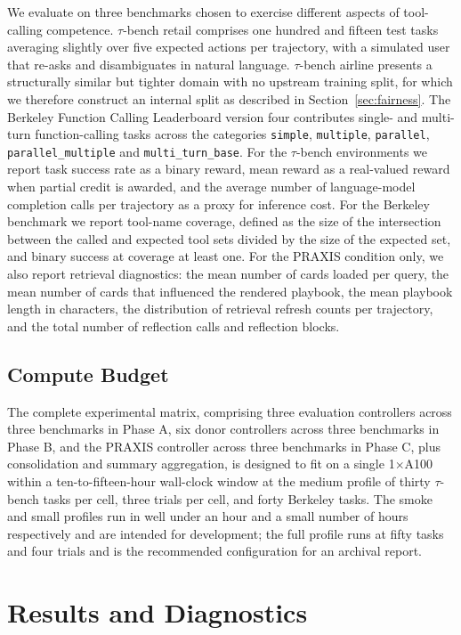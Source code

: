 \documentclass[conference]{IEEEtran}
\begin{document}
We evaluate on three benchmarks chosen to exercise different
aspects of tool-calling competence. $\tau$-bench retail comprises
one hundred and fifteen test tasks averaging slightly over five
expected actions per trajectory, with a simulated user that
re-asks and disambiguates in natural language. $\tau$-bench
airline presents a structurally similar but tighter domain with
no upstream training split, for which we therefore construct an
internal split as described in Section~\ref{sec:fairness}. The
Berkeley Function Calling Leaderboard version four contributes
single- and multi-turn function-calling tasks across the
categories \texttt{simple}, \texttt{multiple}, \texttt{parallel},
\texttt{parallel\_multiple} and \texttt{multi\_turn\_base}. For
the $\tau$-bench environments we report task success rate as a
binary reward, mean reward as a real-valued reward when partial
credit is awarded, and the average number of language-model
completion calls per trajectory as a proxy for inference cost.
For the Berkeley benchmark we report tool-name coverage, defined
as the size of the intersection between the called and expected
tool sets divided by the size of the expected set, and binary
success at coverage at least one. For the PRAXIS condition only,
we also report retrieval diagnostics: the mean number of cards
loaded per query, the mean number of cards that influenced the
rendered playbook, the mean playbook length in characters, the
distribution of retrieval refresh counts per trajectory, and the
total number of reflection calls and reflection blocks.

\subsection{Compute Budget}

The complete experimental matrix, comprising three evaluation
controllers across three benchmarks in Phase A, six donor
controllers across three benchmarks in Phase B, and the PRAXIS
controller across three benchmarks in Phase C, plus consolidation
and summary aggregation, is designed to fit on a single
1$\times$A100 within a ten-to-fifteen-hour wall-clock window at
the medium profile of thirty $\tau$-bench tasks per cell, three
trials per cell, and forty Berkeley tasks. The smoke and small
profiles run in well under an hour and a small number of hours
respectively and are intended for development; the full profile
runs at fifty tasks and four trials and is the recommended
configuration for an archival report.

\section{Results and Diagnostics}\label{sec:results}
\end{document}
